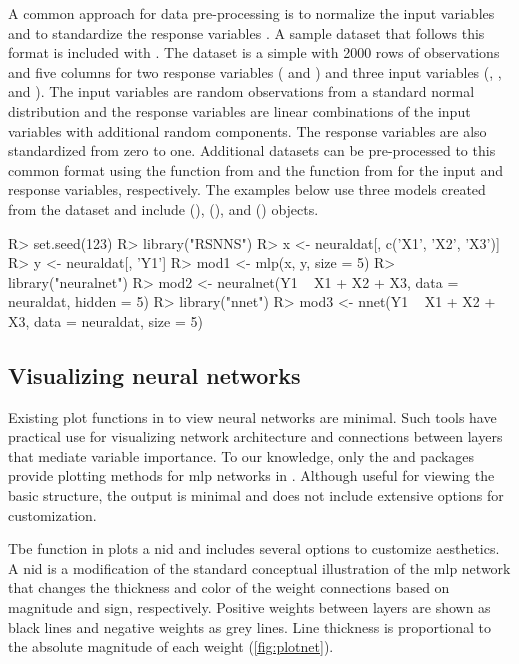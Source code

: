 \documentclass[article,shortnames]{jss}
\begin{document}
A common approach for data pre-processing is to normalize the input variables and to standardize the response variables \citep{Lek00,Olden02}.  A sample dataset that follows this format is included with .  The  dataset is a simple  with 2000 rows of observations and five columns for two response variables ( and ) and three input variables (, , and ).  The input variables are random observations from a standard normal distribution and the response variables are linear combinations of the input variables with additional random components.  The response variables are also standardized from zero to one.  Additional datasets can be pre-processed to this common format using the  function from  and the  function from  for the input and response variables, respectively.  The examples below use three models created from the  dataset and include  (),  (), and  () objects.

\begin{Schunk}
\begin{Sinput}
R> set.seed(123)
R> library("RSNNS")
R> x <- neuraldat[, c('X1', 'X2', 'X3')]
R> y <- neuraldat[, 'Y1']
R> mod1 <- mlp(x, y, size = 5)
R> library("neuralnet")
R> mod2 <- neuralnet(Y1 ~ X1 + X2 + X3, data = neuraldat, hidden = 5)
R> library("nnet")
R> mod3 <- nnet(Y1 ~ X1 + X2 + X3, data = neuraldat, size = 5)
\end{Sinput}
\end{Schunk}

\subsection{Visualizing neural networks}

Existing plot functions in  to view neural networks are minimal.  Such tools have practical use for visualizing network architecture and connections between layers that mediate variable importance. To our knowledge, only the  and  packages provide plotting methods for \ac{mlp} networks in .  Although useful for viewing the basic structure, the output is minimal and does not include extensive options for customization.

Tbe  function in  plots a \acl{nid} \citep[\acs{nid},][]{Ozesmi99} and includes several options to customize aesthetics. A \ac{nid} is a modification of the standard conceptual illustration of the \ac{mlp} network that changes the thickness and color of the weight connections based on magnitude and sign, respectively.  Positive weights between layers are shown as black lines and negative weights as grey lines. Line thickness is proportional to the absolute magnitude of each weight (\cref{fig:plotnet}).
\end{document}
